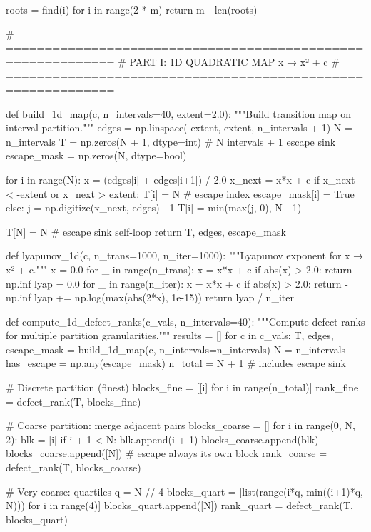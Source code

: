 {{{{{{{{{{{{{    roots = {find(i) for i in range(2 * m)}
    return m - len(roots)


# ============================================================
# PART I: 1D QUADRATIC MAP  x → x² + c
# ============================================================

def build_1d_map(c, n_intervals=40, extent=2.0):
    """Build transition map on interval partition."""
    edges = np.linspace(-extent, extent, n_intervals + 1)
    N = n_intervals
    T = np.zeros(N + 1, dtype=int)  # N intervals + 1 escape sink
    escape_mask = np.zeros(N, dtype=bool)
    
    for i in range(N):
        x = (edges[i] + edges[i+1]) / 2.0
        x_next = x*x + c
        if x_next < -extent or x_next > extent:
            T[i] = N  # escape index
            escape_mask[i] = True
        else:
            j = np.digitize(x_next, edges) - 1
            T[i] = min(max(j, 0), N - 1)
    
    T[N] = N  # escape sink self-loop
    return T, edges, escape_mask


def lyapunov_1d(c, n_trans=1000, n_iter=1000):
    """Lyapunov exponent for x → x² + c."""
    x = 0.0
    for _ in range(n_trans):
        x = x*x + c
        if abs(x) > 2.0:
            return -np.inf
    lyap = 0.0
    for _ in range(n_iter):
        x = x*x + c
        if abs(x) > 2.0:
            return -np.inf
        lyap += np.log(max(abs(2*x), 1e-15))
    return lyap / n_iter


def compute_1d_defect_ranks(c_vals, n_intervals=40):
    """Compute defect ranks for multiple partition granularities."""
    results = []
    for c in c_vals:
        T, edges, escape_mask = build_1d_map(c, n_intervals=n_intervals)
        N = n_intervals
        has_escape = np.any(escape_mask)
        n_total = N + 1  # includes escape sink
        
        # Discrete partition (finest)
        blocks_fine = [[i] for i in range(n_total)]
        rank_fine = defect_rank(T, blocks_fine)
        
        # Coarse partition: merge adjacent pairs
        blocks_coarse = []
        for i in range(0, N, 2):
            blk = [i]
            if i + 1 < N:
                blk.append(i + 1)
            blocks_coarse.append(blk)
        blocks_coarse.append([N])  # escape always its own block
        rank_coarse = defect_rank(T, blocks_coarse)
        
        # Very coarse: quartiles
        q = N // 4
        blocks_quart = [list(range(i*q, min((i+1)*q, N))) for i in range(4)]
        blocks_quart.append([N])
        rank_quart = defect_rank(T, blocks_quart)
        
}}}}}}}}}}}}}

